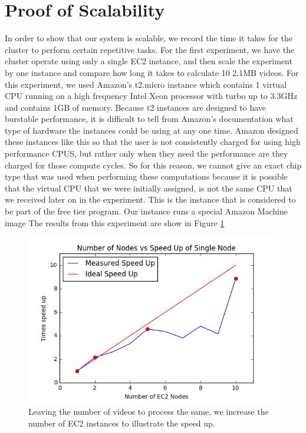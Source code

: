 \section{\label{section:scalability}Proof of Scalability}
In order to show that our system is scalable, we record the time it takes for
the cluster to perform certain repetitive tasks. For the first experiment, we
have the cluster operate using only a single EC2 instance, and then scale the
experiment by one instance and compare how long it takes to calculate 10 2.1MB
videos. For this experiment, we used Amazon's t2.micro instance which contains 1
virtual CPU running on a high frequency Intel Xeon processor with turbo up to
3.3GHz and contains 1GB of memory. Because t2 instances are designed to  have
burstable performance, it is difficult to tell from Amazon's documentation what
type of hardware the instances could be using at any one time. Amazon designed
these instances like this so that the user is not consistently charged  for using
high performance CPUS, but rather only when they need the performance are  they
charged for those compute cycles. So for this reason, we cannot give an  exact
chip type that was used when performing these computations because it is possible
that the virtual CPU that we were initially assigned, is not the same CPU that
we received later on in the experiment. This is the instance
that is considered to be part of the free tier program. Our instance runs a
special Amazon Machine image The results from this experiment are show in Figure
\ref{fig:speed_up}

\begin{figure}[h]
  \label{fig:speed_up}
  \centering
  \includegraphics[width=.8\textwidth]{figures/speed_up}
  \caption{Leaving the number of videos to process the same, we increase the
  number of EC2 instances to illustrate the speed up.}
\end{figure}

